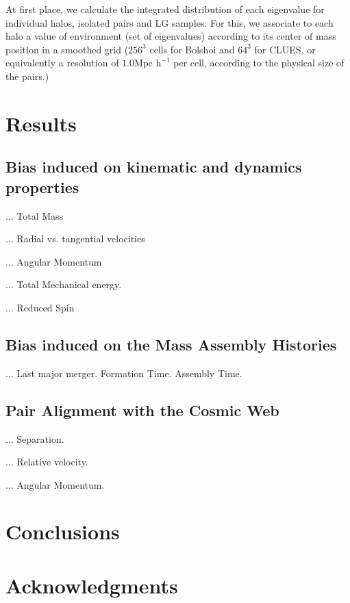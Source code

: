 \documentclass[usenatbib]{latex/mn2e}
\begin{document}
At first place, we calculate the integrated distribution of each 
eigenvalue for individual halos, isolated pairs and LG samples. For this, 
we associate to each halo a value of environment (set of eigenvalues)
according to its center of mass position in a smoothed grid ($256^3$ 
cells for Bolshoi and $64^3$ for CLUES, or equivalently a resolution of 
$1.0 \mbox{Mpc h}^{-1} $ per cell, according to the physical size of the 
pairs.)

\section{Results}
\label{sec:Results}

\subsection{Bias induced on kinematic and dynamics properties}

... Total Mass

... Radial vs. tangential velocities

... Angular Momentum

... Total Mechanical energy.

... Reduced Spin

\subsection{Bias induced on the Mass Assembly Histories}

... Last major merger. Formation Time. Assembly Time.

\subsection{Pair Alignment with the Cosmic Web}

... Separation.

... Relative velocity.

... Angular Momentum.



\section{Conclusions}
\label{sec:conclusions}


\section*{Acknowledgments}  



 
\end{document}
